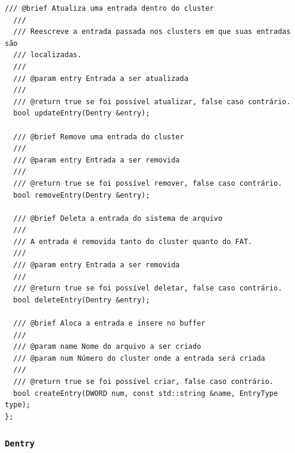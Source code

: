 \documentclass[
    12pt,				%
    oneside,   	        %
    a4paper,			%
    english,			%
    french,				%
    spanish,			%
    brazil,				%
    ]{pacotes/abntex2}
\begin{document}
\begin{lstlisting}[caption={Classe de abstração dos clusters do sistema}, label={lst:cluster_io}]
  /// @brief Atualiza uma entrada dentro do cluster
  ///
  /// Reescreve a entrada passada nos clusters em que suas entradas são
  /// localizadas.
  ///
  /// @param entry Entrada a ser atualizada
  ///
  /// @return true se foi possível atualizar, false caso contrário.
  bool updateEntry(Dentry &entry);

  /// @brief Remove uma entrada do cluster
  ///
  /// @param entry Entrada a ser removida
  ///
  /// @return true se foi possível remover, false caso contrário.
  bool removeEntry(Dentry &entry);

  /// @brief Deleta a entrada do sistema de arquivo
  ///
  /// A entrada é removida tanto do cluster quanto do FAT.
  ///
  /// @param entry Entrada a ser removida
  ///
  /// @return true se foi possível deletar, false caso contrário.
  bool deleteEntry(Dentry &entry);

  /// @brief Aloca a entrada e insere no buffer
  /// 
  /// @param name Nome do arquivo a ser criado
  /// @param num Número do cluster onde a entrada será criada
  /// 
  /// @return true se foi possível criar, false caso contrário.
  bool createEntry(DWORD num, const std::string &name, EntryType type);
};
\end{lstlisting}

\subsubsection{\texttt{Dentry}}
\label{subsubsec:dentry}
\end{document}
